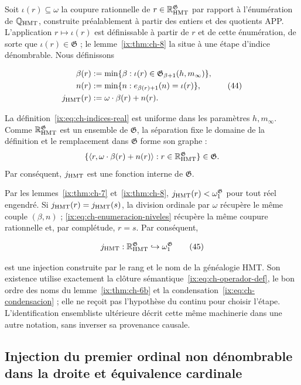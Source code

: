 Soit \(\iota(r)\subseteq\omega\) la coupure rationnelle de
\(r\in\mathbb R_{\rm HMT}^{\mathfrak G}\) par rapport à l’énumération de
\(\mathbb Q_{\rm HMT}\), construite préalablement à partir des entiers et des quotients
APP. L’application \(r\mapsto\iota(r)\) est définissable à partir de \(r\) et de cette énumération,
de sorte que \(\iota(r)\in\mathfrak G\) ; le lemme~\ref{ix:thm:ch-8} la situe à une étape
d’indice dénombrable. Nous définissons

\[
 \begin{aligned}
  \beta(r)&:=\min\{\beta:
       \iota(r)\in\mathfrak G_{\beta+1}(h,m_\infty)\},\\
  n(r)&:=\min\{n:e_{\beta(r)+1}(n)=\iota(r)\},\\
  j_{\rm HMT}(r)&:=\omega\cdot\beta(r)+n(r).
 \end{aligned}
\tag{44}\label{ix:eq:ch-indices-real}
\]

La définition~\eqref{ix:eq:ch-indices-real} est uniforme dans les paramètres \(h,m_\infty\). Comme \(\mathbb R_{\rm HMT}^{\mathfrak G}\) est un ensemble de \(\mathfrak G\), la séparation fixe le domaine de la définition et le remplacement dans \(\mathfrak G\) forme son graphe :
\[
 \{\langle r,\omega\cdot\beta(r)+n(r)\rangle:
 r\in\mathbb R_{\rm HMT}^{\mathfrak G}\}\in\mathfrak G.
\]
Par conséquent, \(j_{\rm HMT}\) est une fonction interne de \(\mathfrak G\).

Par les lemmes~\ref{ix:thm:ch-7} et~\ref{ix:thm:ch-8},
\(j_{\rm HMT}(r)<\omega_1^{\mathfrak G}\) pour tout
réel engendré. Si \(j_{\rm HMT}(r)=j_{\rm HMT}(s)\), la division ordinale par
\(\omega\) récupère le même couple \((\beta,n)\) ; \eqref{ix:eq:ch-enumeracion-niveles} récupère la même coupure
rationnelle et, par complétude, \(r=s\). Par conséquent,

\[
 j_{\rm HMT}:\mathbb R_{\rm HMT}^{\mathfrak G}
 \hookrightarrow\omega_1^{\mathfrak G}
\tag{45}\label{ix:eq:ch-inyeccion-j}
\]

est une injection construite par le rang et le nom de la généalogie HMT. Son existence utilise exactement la clôture sémantique~\eqref{ix:eq:ch-operador-def}, le bon ordre des noms du lemme~\ref{ix:thm:ch-6b} et la condensation~\eqref{ix:eq:ch-condensacion} ; elle ne reçoit pas l'hypothèse du continu pour choisir l'étape. L'identification ensembliste ultérieure décrit cette même machinerie dans une autre notation, sans inverser sa provenance causale.

\subsection{Injection du premier ordinal non dénombrable dans la droite et équivalence cardinale}

